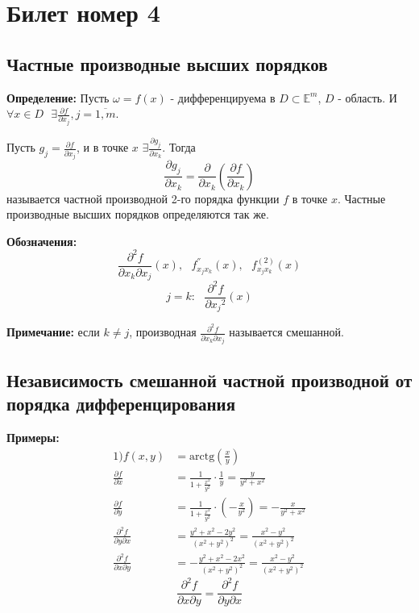 \documentclass[a4paper,12pt]{article} %
\begin{document}
	
\section*{Билет номер 4}

	\subsection*{Частные производные высших порядков}
	
	\textbf{Определение:} Пусть $\omega = f(x)$ - дифференцируема в $D \subset \mathbb{E}^m$, $D$ - область.
	И $\forall x \in D \text{ }\exists \frac{\partial{f}}{\partial{x_j}}, j = \overline{1, m}$.
	
	Пусть $g_j = \frac{\partial{f}}{\partial{x_j}}$, и в точке $x$ $\exists\frac{\partial{g_j}}{\partial{x_k}}$. Тогда
	\[
		\frac{\partial{g_j}}{\partial{x_k}} = \frac{\partial{ }}{\partial{x_k}}\left(\frac{\partial{f}}{\partial{x_k}}\right)
	\]
	называется частной производной 2-го порядка функции $f$ в точке $x$. Частные производные высших порядков определяются так же.
	
	\textbf{Обозначения:} 
	\[		
		\frac{\partial^2f}{\partial{x_k}\partial{x_j}}(x), \text{   } f^{''}_{x_jx_k}(x), \text{   } f^{(2)}_{x_jx_k}(x)
	\]
	\[
		j = k: \text{ }\frac{\partial^2f}{\partial{x_j}^2}(x)
	\]
	
	\textbf{Примечание:} если $k\neq j$, производная $\frac{\partial^2f}{\partial x_k\partial x_j}$ называется смешанной.
	
	\subsection*{Независимость смешанной частной производной от порядка дифференцирования}
	
	\textbf{Примеры:}
	\begin{align*}
		1) f(x, y) &= \text{arctg}\left(\frac{x}{y}\right)\\
		\frac{\partial{f}}{\partial{x}} &= \frac{1}{1+\frac{x^2}{y^2}}\cdot\frac{1}{y} = \frac{y}{y^2+x^2}\\
		\frac{\partial{f}}{\partial{y}} &= \frac{1}{1+\frac{x^2}{y^2}}\cdot\left(-\frac{x}{y^2}\right) = -\frac{x}{y^2+x^2}\\
		\frac{\partial^2f}{\partial{y}\partial{x}} &= \frac{y^2+x^2-2y^2}{(x^2+y^2)^2} = \frac{x^2-y^2}{(x^2+y^2)^2}\\
		\frac{\partial^2f}{\partial{x}\partial{y}} &= -\frac{y^2+x^2-2x^2}{(x^2+y^2)^2} = \frac{x^2-y^2}{(x^2+y^2)^2}
	\end{align*}
	\[
		\frac{\partial^2f}{\partial{x}\partial{y}} = \frac{\partial^2f}{\partial{y}\partial{x}}
	\]
	
\end{document}
